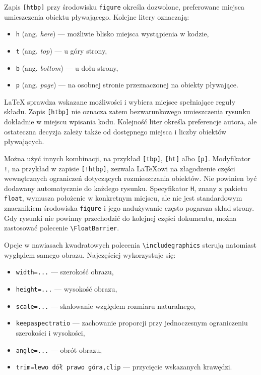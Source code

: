 Zapis \verb|[htbp]| przy środowisku \texttt{figure} określa dozwolone, preferowane miejsca umieszczenia obiektu pływającego. Kolejne litery oznaczają:

\begin{itemize}
  \item \texttt{h} (ang. \emph{here}) — możliwie blisko miejsca wystąpienia w kodzie,
  \item \texttt{t} (ang. \emph{top}) — u góry strony,
  \item \texttt{b} (ang. \emph{bottom}) — u dołu strony,
  \item \texttt{p} (ang. \emph{page}) — na osobnej stronie przeznaczonej na obiekty pływające.
\end{itemize}

LaTeX sprawdza wskazane możliwości i wybiera miejsce spełniające reguły składu. Zapis \verb|[htbp]| nie oznacza zatem bezwarunkowego umieszczenia rysunku dokładnie w miejscu wpisania kodu. Kolejność liter określa preferencje autora, ale ostateczna decyzja zależy także od dostępnego miejsca i liczby obiektów pływających.

Można użyć innych kombinacji, na przykład \verb|[tbp]|, \verb|[ht]| albo \verb|[p]|. Modyfikator \texttt{!}, na przykład w zapisie \verb|[!htbp]|, zezwala LaTeXowi na złagodzenie części wewnętrznych ograniczeń dotyczących rozmieszczania obiektów. Nie powinien być dodawany automatycznie do każdego rysunku. Specyfikator \texttt{H}, znany z pakietu \texttt{float}, wymusza położenie w konkretnym miejscu, ale nie jest standardowym znacznikiem środowiska \texttt{figure} i jego nadużywanie często pogarsza skład strony. Gdy rysunki nie powinny przechodzić do kolejnej części dokumentu, można zastosować polecenie \verb|\FloatBarrier|.

Opcje w nawiasach kwadratowych polecenia \verb|\includegraphics| sterują natomiast wyglądem samego obrazu. Najczęściej wykorzystuje się:

\begin{itemize}
  \item \verb|width=...| — szerokość obrazu,
  \item \verb|height=...| — wysokość obrazu,
  \item \verb|scale=...| — skalowanie względem rozmiaru naturalnego,
  \item \verb|keepaspectratio| — zachowanie proporcji przy jednoczesnym ograniczeniu szerokości i wysokości,
  \item \verb|angle=...| — obrót obrazu,
  \item \verb|trim=lewo dół prawo góra,clip| — przycięcie wskazanych krawędzi.
\end{itemize}

